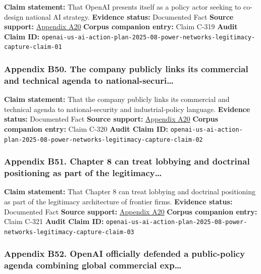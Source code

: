 \documentclass[
  american,
  11pt,
  letterpaper,
]{article}
\begin{document}
\textbf{Claim statement:} That OpenAI presents itself as a policy actor
seeking to co-design national AI strategy. \textbf{Evidence status:}
Documented Fact \textbf{Source support:}
\hyperref[appendix-a20-openais-proposals-for-the-us-ai-action-plan]{Appendix
A20} \textbf{Corpus companion entry:} Claim C-319 \textbf{Audit Claim
ID:}
\texttt{openai-us-ai-action-plan-2025-08-power-networks-legitimacy-capture-claim-01}

\subsubsection{Appendix B50. The company publicly links its commercial
and technical agenda to
national-securi\ldots{}}\label{appendix-b50-the-company-publicly-links-its-commercial-and-technical-agenda-to-national-securi}

\textbf{Claim statement:} That the company publicly links its commercial
and technical agenda to national-security and industrial-policy
language. \textbf{Evidence status:} Documented Fact \textbf{Source
support:}
\hyperref[appendix-a20-openais-proposals-for-the-us-ai-action-plan]{Appendix
A20} \textbf{Corpus companion entry:} Claim C-320 \textbf{Audit Claim
ID:}
\texttt{openai-us-ai-action-plan-2025-08-power-networks-legitimacy-capture-claim-02}

\subsubsection{Appendix B51. Chapter 8 can treat lobbying and doctrinal
positioning as part of the
legitimacy\ldots{}}\label{appendix-b51-chapter-8-can-treat-lobbying-and-doctrinal-positioning-as-part-of-the-legitimacy}

\textbf{Claim statement:} That Chapter 8 can treat lobbying and
doctrinal positioning as part of the legitimacy architecture of frontier
firms. \textbf{Evidence status:} Documented Fact \textbf{Source
support:}
\hyperref[appendix-a20-openais-proposals-for-the-us-ai-action-plan]{Appendix
A20} \textbf{Corpus companion entry:} Claim C-321 \textbf{Audit Claim
ID:}
\texttt{openai-us-ai-action-plan-2025-08-power-networks-legitimacy-capture-claim-03}

\subsubsection{Appendix B52. OpenAI officially defended a public-policy
agenda combining global commercial
exp\ldots{}}\label{appendix-b52-openai-officially-defended-a-public-policy-agenda-combining-global-commercial-exp}
\end{document}

